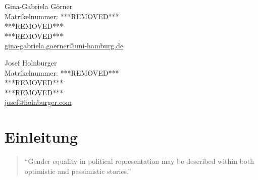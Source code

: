 \documentclass[12pt, 
    twoside=false, 
    bibliography=totoc, 
    numbers=endperiod, 
    headings=normal, 
    toc=chapterentrydotfill
    ]{scrbook}
\begin{document}
\begin{titlepage}
	\begin{minipage}[t]{0.48\textwidth}
    \flushleft 
    Gina-Gabriela Görner \\
    Matrikelnummer: ***REMOVED*** \\
    ***REMOVED*** \vspace{0.1cm} \\ 
	***REMOVED*** \vspace{0.1cm}  \\
	\href{mailto:gina-gabriela.goerner@uni-hamburg.de}{gina-gabriela.goerner@uni-hamburg.de} \\
    \end{minipage}
    \begin{minipage}[t]{0.48\textwidth}
	\flushleft
	Josef Holnburger \\
	Matrikelnummer: ***REMOVED*** \\
	***REMOVED*** \vspace{0.1cm} \\
	***REMOVED*** \vspace{0.1cm} \\
	\href{mailto:josef@holnburger.com}{josef@holnburger.com} \\
    \end{minipage}

\end{titlepage}


\tableofcontents
\thispagestyle{empty}

\frontmatter

\listoffigures
{}
\vspace*{24pt}
{\let\clearpage\relax \listoftables}	

\mainmatter



\chapter{Einleitung}\label{Einleitung} 

\begin{quote}
    \enquote{Gender equality in political representation may be described within both optimistic and pessimistic stories.} \parencite[149]{celis_2018}
\end{quote}
\end{document}
